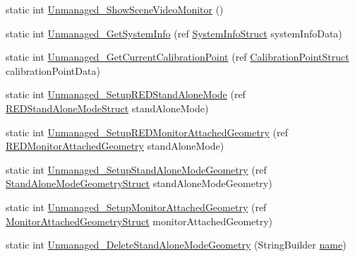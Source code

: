 \begin{DoxyCompactItemize}
static int \hyperlink{class_web_analyzer_1_1_eye_tracking_1_1_eye_tracking_controller_afc67a7e356368738f77eb79274ec7c45}{Unmanaged\+\_\+\+Show\+Scene\+Video\+Monitor} ()
\item 
static int \hyperlink{class_web_analyzer_1_1_eye_tracking_1_1_eye_tracking_controller_a871d326dc0a6982290dffa97b78b509a}{Unmanaged\+\_\+\+Get\+System\+Info} (ref \hyperlink{struct_web_analyzer_1_1_eye_tracking_1_1_eye_tracking_controller_1_1_system_info_struct}{System\+Info\+Struct} system\+Info\+Data)
\item 
static int \hyperlink{class_web_analyzer_1_1_eye_tracking_1_1_eye_tracking_controller_a4710faf5e9e93a98a1fc67aac1ff0937}{Unmanaged\+\_\+\+Get\+Current\+Calibration\+Point} (ref \hyperlink{struct_web_analyzer_1_1_eye_tracking_1_1_eye_tracking_controller_1_1_calibration_point_struct}{Calibration\+Point\+Struct} calibration\+Point\+Data)
\item 
static int \hyperlink{class_web_analyzer_1_1_eye_tracking_1_1_eye_tracking_controller_ac3cb63e9be8f32e187d15be1172b3461}{Unmanaged\+\_\+\+Setup\+R\+E\+D\+Stand\+Alone\+Mode} (ref \hyperlink{struct_web_analyzer_1_1_eye_tracking_1_1_eye_tracking_controller_1_1_r_e_d_stand_alone_mode_struct}{R\+E\+D\+Stand\+Alone\+Mode\+Struct} stand\+Alone\+Mode)
\item 
static int \hyperlink{class_web_analyzer_1_1_eye_tracking_1_1_eye_tracking_controller_ab4cc50a739350182756460705bb4ef8e}{Unmanaged\+\_\+\+Setup\+R\+E\+D\+Monitor\+Attached\+Geometry} (ref \hyperlink{struct_web_analyzer_1_1_eye_tracking_1_1_eye_tracking_controller_1_1_r_e_d_monitor_attached_geometry}{R\+E\+D\+Monitor\+Attached\+Geometry} stand\+Alone\+Mode)
\item 
static int \hyperlink{class_web_analyzer_1_1_eye_tracking_1_1_eye_tracking_controller_a6c54abfe218be559f062b95513f6653e}{Unmanaged\+\_\+\+Setup\+Stand\+Alone\+Mode\+Geometry} (ref \hyperlink{struct_web_analyzer_1_1_eye_tracking_1_1_eye_tracking_controller_1_1_stand_alone_mode_geometry_struct}{Stand\+Alone\+Mode\+Geometry\+Struct} stand\+Alone\+Mode\+Geometry)
\item 
static int \hyperlink{class_web_analyzer_1_1_eye_tracking_1_1_eye_tracking_controller_aa660de4d7e30a960098a67ea722e1a65}{Unmanaged\+\_\+\+Setup\+Monitor\+Attached\+Geometry} (ref \hyperlink{struct_web_analyzer_1_1_eye_tracking_1_1_eye_tracking_controller_1_1_monitor_attached_geometry_struct}{Monitor\+Attached\+Geometry\+Struct} monitor\+Attached\+Geometry)
\item 
static int \hyperlink{class_web_analyzer_1_1_eye_tracking_1_1_eye_tracking_controller_a81fef06f390477707fa092521b2cc97d}{Unmanaged\+\_\+\+Delete\+Stand\+Alone\+Mode\+Geometry} (String\+Builder \hyperlink{_u_i_2_h_t_m_l_resources_2js_2src_2create__experiment_8js_adac2bcb4f01b574cbc63fe8ee2c56bf0}{name})

\end{DoxyCompactItemize}

